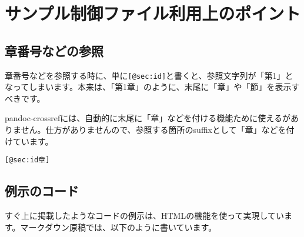 \begin{Shaded}
\begin{Highlighting}[]
    
     \NormalTok{ \{}
            \CharTok{:} \OperatorTok{;}
\NormalTok{        \}}
\OperatorTok{\textgreater{}}
            \CharTok{:} \OperatorTok{;}
\NormalTok{        \}}
\OperatorTok{\textgreater{}}\OperatorTok{\textgreater{}}
            \CharTok{:} \OperatorTok{;}
\NormalTok{        \}}
            \CharTok{:} \OperatorTok{;}
\NormalTok{        \}}
\NormalTok{    \}}
\OperatorTok{\textgreater{}}
\end{Highlighting}
\end{Shaded}

\section{サンプル制御ファイル利用上のポイント}\label{ux30b5ux30f3ux30d7ux30ebux5236ux5fa1ux30d5ux30a1ux30a4ux30ebux5229ux7528ux4e0aux306eux30ddux30a4ux30f3ux30c8}

\subsection{章番号などの参照}\label{ux7ae0ux756aux53f7ux306aux3069ux306eux53c2ux7167}

章番号などを参照する時に、単に\texttt{{[}@sec:id{]}}と書くと、参照文字列が「第1」となってしまいます。本来は、「第1章」のように、末尾に「章」や「節」を表示すべきです。

pandoc-crossrefには、自動的に末尾に「章」などを付ける機能ために使えるがありません。仕方がありませんので、参照する箇所のsuffixとして「章」などを付けています。

\begin{verbatim}
[@sec:id章]
\end{verbatim}

\subsection{例示のコード}\label{ux4f8bux793aux306eux30b3ux30fcux30c9}

すぐ上に掲載したようなコードの例示は、HTMLの機能を使って実現しています。マークダウン原稿では、以下のように書いています。

\begin{Shaded}
\begin{Highlighting}[]
\DataTypeTok{\textless{}}\OperatorTok{=}\OtherTok{ }\DataTypeTok{\textgreater{}}
\DataTypeTok{\textless{}/}\DataTypeTok{\textgreater{}}
\end{Highlighting}
\end{Shaded}
